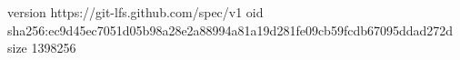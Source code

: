 version https://git-lfs.github.com/spec/v1
oid sha256:ec9d45ec7051d05b98a28e2a88994a81a19d281fe09cb59fcdb67095ddad272d
size 1398256
